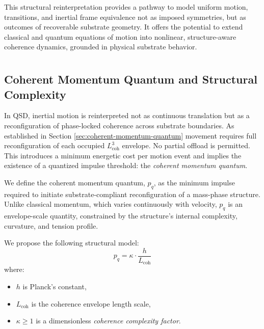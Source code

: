 \documentclass[entropy,article,submit,pdftex,oneauthor]{Definitions/mdpi}
\begin{document}
This structural reinterpretation provides a pathway to model uniform motion, transitions, and inertial frame equivalence not as imposed symmetries, but as outcomes of recoverable substrate geometry. It offers the potential to extend classical and quantum equations of motion into nonlinear, structure-aware coherence dynamics, grounded in physical substrate behavior.

\section[\appendixname~\thesection]{}
\subsection[\appendixname~\thesubsection]{Coherent Momentum Quantum and Structural Complexity}
\label{app:coherent-momentum-quantum}
In QSD, inertial motion is reinterpreted not as continuous translation but as a reconfiguration of phase-locked coherence across substrate boundaries. As established in Section \ref{sec:coherent-momentum-quantum} movement requires full reconfiguration of each occupied \texorpdfstring{\( L_{\text{coh}}^3 \)}{Lcoh\^{}3} envelope. No partial offload is permitted. This introduces a minimum energetic cost per motion event and implies the existence of a quantized impulse threshold: the \textit{coherent momentum quantum}.

We define the coherent momentum quantum, \texorpdfstring{\( p_q \)}{pq}, as the minimum impulse required to initiate substrate-compliant reconfiguration of a mass-phase structure. Unlike classical momentum, which varies continuously with velocity, \texorpdfstring{\( p_q \)}{pq} is an envelope-scale quantity, constrained by the structure's internal complexity, curvature, and tension profile.

We propose the following structural model:
\[
p_q = \kappa \cdot \frac{h}{L_{\text{coh}}}
\]
where:
\begin{itemize}
    \item \( h \) is Planck’s constant,
    \item \( L_{\text{coh}} \) is the coherence envelope length scale,
    \item \( \kappa \geq 1 \) is a dimensionless \textit{coherence complexity factor}.
\end{itemize}
\end{document}
